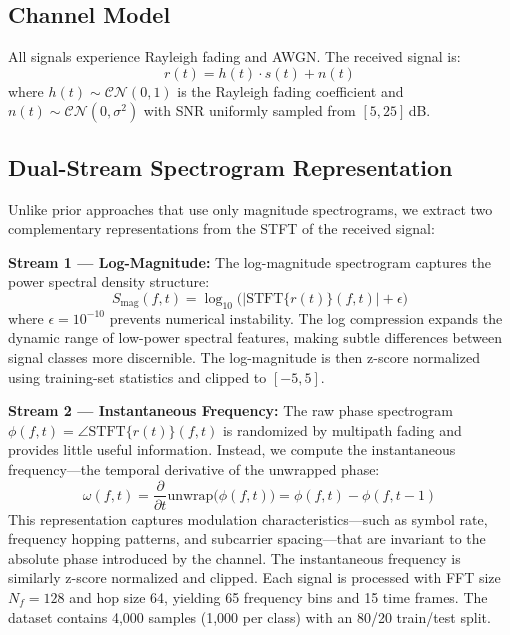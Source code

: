 \documentclass[conference]{IEEEtran}
\begin{document}
\subsection{Channel Model}

All signals experience Rayleigh fading and AWGN. The received signal is:
\begin{equation}\label{eq:channel}
r(t) = h(t) \cdot s(t) + n(t)
\end{equation}
where $h(t) \sim \mathcal{CN}(0,1)$ is the Rayleigh fading coefficient and $n(t) \sim \mathcal{CN}(0,\sigma^2)$ with SNR uniformly sampled from $[5, 25]$\,dB.

\subsection{Dual-Stream Spectrogram Representation}

Unlike prior approaches that use only magnitude spectrograms, we extract two complementary representations from the STFT of the received signal:

\noindent\textbf{Stream 1 --- Log-Magnitude:} The log-magnitude spectrogram captures the power spectral density structure:
\begin{equation}\label{eq:logmag}
S_{\text{mag}}(f,t) = \log_{10}\bigl(|\text{STFT}\{r(t)\}(f,t)| + \epsilon\bigr)
\end{equation}
where $\epsilon = 10^{-10}$ prevents numerical instability. The log compression expands the dynamic range of low-power spectral features, making subtle differences between signal classes more discernible. The log-magnitude is then z-score normalized using training-set statistics and clipped to $[-5, 5]$.

\noindent\textbf{Stream 2 --- Instantaneous Frequency:} The raw phase spectrogram $\phi(f,t) = \angle\text{STFT}\{r(t)\}(f,t)$ is randomized by multipath fading and provides little useful information. Instead, we compute the instantaneous frequency---the temporal derivative of the unwrapped phase:
\begin{equation}\label{eq:instfreq}
\omega(f,t) = \frac{\partial}{\partial t}\text{unwrap}\bigl(\phi(f,t)\bigr) = \phi(f,t) - \phi(f,t{-}1)
\end{equation}
This representation captures modulation characteristics---such as symbol rate, frequency hopping patterns, and subcarrier spacing---that are invariant to the absolute phase introduced by the channel. The instantaneous frequency is similarly z-score normalized and clipped. Each signal is processed with FFT size $N_f = 128$ and hop size 64, yielding 65 frequency bins and 15 time frames. The dataset contains 4,000 samples (1,000 per class) with an 80/20 train/test split.
\end{document}
